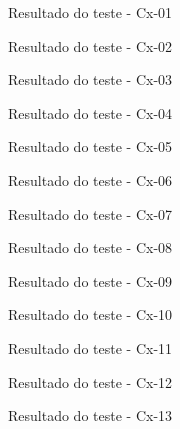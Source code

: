 \begin{figure}[htb!]\caption{Resultado do teste - Cx-01}\label{fig:cx1}\end{figure}
\begin{figure}[htb!]\caption{Resultado do teste - Cx-02}\label{fig:cx2}\end{figure}
\begin{figure}[htb!]\caption{Resultado do teste - Cx-03}\label{fig:cx3}\end{figure}
\begin{figure}[htb!]\caption{Resultado do teste - Cx-04}\label{fig:cx4}\end{figure}
\begin{figure}[htb!]\caption{Resultado do teste - Cx-05}\label{fig:cx5}\end{figure}
\begin{figure}[htb!]\caption{Resultado do teste - Cx-06}\label{fig:cx6}\end{figure}
\begin{figure}[htb!]\caption{Resultado do teste - Cx-07}\label{fig:cx7}\end{figure}
\begin{figure}[htb!]\caption{Resultado do teste - Cx-08}\label{fig:cx8}\end{figure}
\begin{figure}[htb!]\caption{Resultado do teste - Cx-09}\label{fig:cx9}\end{figure}
\begin{figure}[htb!]\caption{Resultado do teste - Cx-10}\label{fig:cx10}\end{figure}
\begin{figure}[htb!]\caption{Resultado do teste - Cx-11}\label{fig:cx11}\end{figure}
\begin{figure}[htb!]\caption{Resultado do teste - Cx-12}\label{fig:cx12}\end{figure}
\begin{figure}[htb!]\caption{Resultado do teste - Cx-13}\label{fig:cx13}\end{figure}
